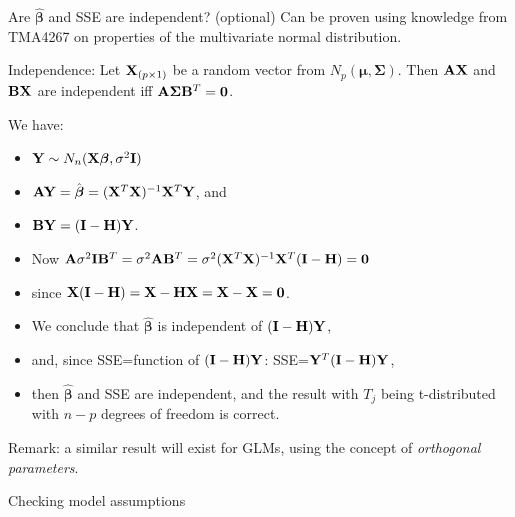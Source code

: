 \documentclass[
  ignorenonframetext,
]{beamer}
\begin{document}
\begin{frame}
\begin{block}{Are \(\hat{\boldsymbol{\beta}}\) and SSE are independent?
(optional)}
\protect{}\label{are-hatboldsymbolbeta-and-sse-are-independent-optional}
Can be proven using knowledge from TMA4267 on properties of the
multivariate normal distribution.

Independence: Let \({\bf X}_{(p \times 1)}\) be a random vector from
\(N_p({\boldsymbol \mu},{\boldsymbol \Sigma})\). Then \({\bf A}{\bf X}\)
and \({\bf B}{\bf X}\) are independent iff
\({\bf A}{\boldsymbol \Sigma}{\bf B}^T={\bf 0}\).

We have:

\begin{itemize}
\item
  \({\bf Y}\sim N_n({\bf X}{\boldsymbol \beta},\sigma^2{\bf I})\)
\item
  \({\bf AY}=\hat{ {\boldsymbol \beta}}=({\bf X}^T{\bf X})^{-1}{\bf X}^T {\bf Y}\),
  and
\item
  \({\bf BY}=({\bf I}-{\bf H}){\bf Y}\).
\item
  Now
  \({\bf A}\sigma^2{\bf I}{\bf B}^T=\sigma^2 {\bf A}{\bf B}^T=\sigma^2 ({\bf X}^T{\bf X})^{-1}{\bf X}^T ({\bf I}-{\bf H})={\bf 0}\)
\item
  since
  \({\bf X}({\bf I}-{\bf H})={\bf X}-{\bf HX}={\bf X}-{\bf X}={\bf 0}\).
\item
  We conclude that \(\hat{ {\boldsymbol \beta}}\) is independent of
  \(({\bf I}-{\bf H}){\bf Y}\),
\item
  and, since SSE=function of \(({\bf I}-{\bf H}){\bf Y}\):
  SSE=\({\bf Y}^T({\bf I}-{\bf H}){\bf Y}\),
\item
  then \(\hat{ {\boldsymbol \beta}}\) and SSE are independent, and the
  result with \(T_j\) being t-distributed with \(n-p\) degrees of
  freedom is correct.
\end{itemize}

Remark: a similar result will exist for GLMs, using the concept of
\emph{orthogonal parameters}.
\end{block}
\end{frame}

\begin{frame}{Checking model assumptions}
\protect{}\label{checking-model-assumptions}
\end{frame}
\end{document}
